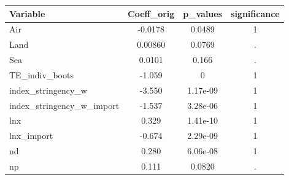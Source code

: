 \documentclass[]{article}
\begin{document}
\begin{tabular}{lccc} \hline
Variable & Coeff\_orig & p\_values & significance \\ \hline
Air & -0.0178 & 0.0489 & 1 \\
Land & 0.00860 & 0.0769 & . \\
Sea & 0.0101 & 0.166 & . \\
TE\_indiv\_boots & -1.059 & 0 & 1 \\
index\_stringency\_w & -3.550 & 1.17e-09 & 1 \\
index\_stringency\_w\_import & -1.537 & 3.28e-06 & 1 \\
lnx & 0.329 & 1.41e-10 & 1 \\
lnx\_import & -0.674 & 2.29e-09 & 1 \\
nd & 0.280 & 6.06e-08 & 1 \\
 np & 0.111 & 0.0820 & . \\ \hline
\end{tabular}
\end{document}
